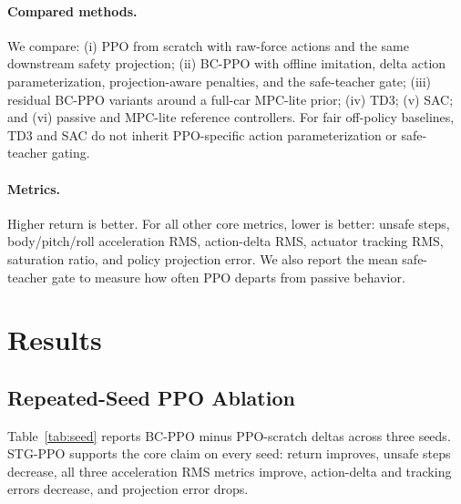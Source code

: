 \documentclass[letterpaper,twocolumn]{article}
\begin{document}
\paragraph{Compared methods.}
We compare: (i) PPO from scratch with raw-force actions and the same downstream safety projection; (ii) BC-PPO with offline imitation, delta action parameterization, projection-aware penalties, and the safe-teacher gate; (iii) residual BC-PPO variants around a full-car MPC-lite prior; (iv) TD3; (v) SAC; and (vi) passive and MPC-lite reference controllers.
For fair off-policy baselines, TD3 and SAC do not inherit PPO-specific action parameterization or safe-teacher gating.

\paragraph{Metrics.}
Higher return is better.
For all other core metrics, lower is better: unsafe steps, body/pitch/roll acceleration RMS, action-delta RMS, actuator tracking RMS, saturation ratio, and policy projection error.
We also report the mean safe-teacher gate to measure how often PPO departs from passive behavior.

\section{Results}

\subsection{Repeated-Seed PPO Ablation}

Table~\ref{tab:seed} reports BC-PPO minus PPO-scratch deltas across three seeds.
STG-PPO supports the core claim on every seed: return improves, unsafe steps decrease, all three acceleration RMS metrics improve, action-delta and tracking errors decrease, and projection error drops.

\begin{table}[t]
\centering
\caption{Repeated-seed evidence. Return delta is higher-is-better; other deltas are lower-is-better.}
\label{tab:seed}
\end{table}
\end{document}
